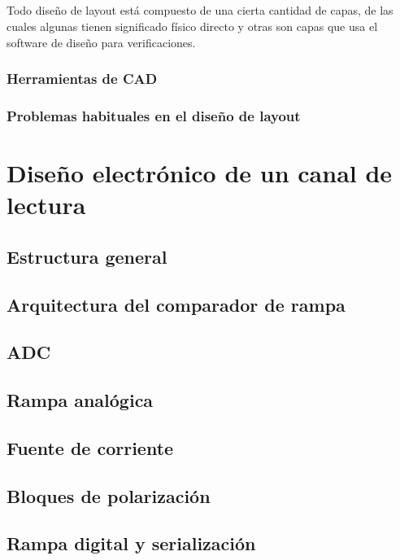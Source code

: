 \documentclass[12pt,a4paper,oneside,titlepage]{report}
\begin{document}
\paragraph{}
Todo diseño de layout está compuesto de una cierta cantidad de capas, de las cuales
algunas tienen significado físico directo y otras son capas que usa el software de
diseño para verificaciones.

\subsection{Herramientas de CAD}

\subsection{Problemas habituales en el diseño de layout}

\chapter{Diseño electrónico de un canal de lectura}

\section{Estructura general}

\section{Arquitectura del comparador de rampa}

\section{ADC}

\section{Rampa analógica}

\section{Fuente de corriente}

\section{Bloques de polarización}

\section{Rampa digital y serialización}
\end{document}
